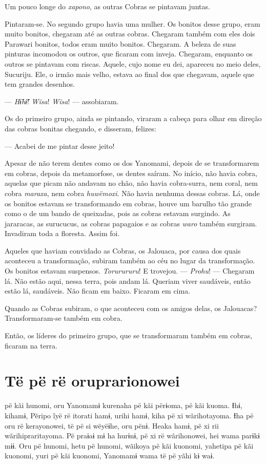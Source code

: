 Um pouco longe do \textit{xapono}, as outras Cobras se pintavam juntas. 

Pintaram-se. No segundo grupo havia uma mulher. Os bonitos desse
grupo, eram muito bonitos, chegaram até as outras cobras. Chegaram
também com eles dois Parawari bonitos, todos eram muito bonitos.
Chegaram. A beleza de suas pinturas incomodou os outros, que ficaram com
inveja. Chegaram, enquanto os outros se pintavam com riscas. Aquele,
cujo nome eu dei, apareceu no meio deles, Sucuriju. Ele, o irmão mais
velho, estava ao final dos que chegavam, aquele que tem grandes
desenhos.

--- \textit{Hɨ̃hɨ̃}! \textit{Wĩsa}! \textit{Wĩsa}! --- assobiaram. 

Os do primeiro grupo, ainda se pintando, viraram a cabeça para olhar em
direção das cobras bonitas chegando, e disseram, felizes:

--- Acabei de me pintar desse jeito! 

Apesar de não terem dentes como os dos Yanomami, depois de se
transformarem em cobras, depois da metamorfose, os dentes saíram. No
início, não havia cobra, aquelas que picam não andavam no chão, não
havia cobra-surra, nem coral, nem cobra \textit{maraxa}, nem
cobra \textit{huwëmoxi}. Não havia nenhuma dessas cobras. Lá, onde os
bonitos estavam se transformando em cobras, houve um barulho tão grande
como o de um bando de queixadas, pois as cobras estavam surgindo. As
jararacas, as surucucus, as cobras papagaios e as
cobras \textit{waro} também surgiram. Invadiram toda a floresta. Assim foi. 

Aqueles que haviam convidado as Cobras, os Jalouaca, por causa dos quais
aconteceu a transformação, subiram também ao céu no lugar da
transformação. Os bonitos estavam suspensos. \textit{Torurururu}! E
trovejou. --- \textit{Prohu}! --- Chegaram lá. Não estão aqui, nessa terra,
pois andam lá. Queriam viver saudáveis, então estão lá, saudáveis. Não
ficam em baixo. Ficaram em cima. 

Quando as Cobras subiram, o que aconteceu com os amigos delas, os
Jalouacas? Transformaram-se também em cobra. 

Então, os líderes do primeiro grupo, que se transformaram também
em cobras, ficaram na terra.

\chapter{Të pë rë oruprarionowei}
 
 pë kãi hunomi, oru Yanomamɨ kurenaha pë kãi përɨoma, pë kãi kuoma.
Ɨhɨ, kihamɨ, Pẽripo ĩyë rë itorati hamɨ, urihi hamɨ, kiha pë xi
wãrihotayoma. Ɨha pë oru rë kerayonowei, të pë si wëyëɨhe, oru pënɨ.
Heaka hamɨ, pë xi rii wãrihipraritayoma. Pë praɨaɨ mɨ ha hurɨnɨ, pë xi
rë wãrihonowei, hei wama parɨkɨ mɨɨ. Oru pë hunomi, hetu pë hunomi,
wãikoya pë kãi kuonomi, yahetipa pë kãi kuonomi, yuri pë kãi kuonomi,
Yanomamɨ wama të pë yãhi kɨ waɨ. 

